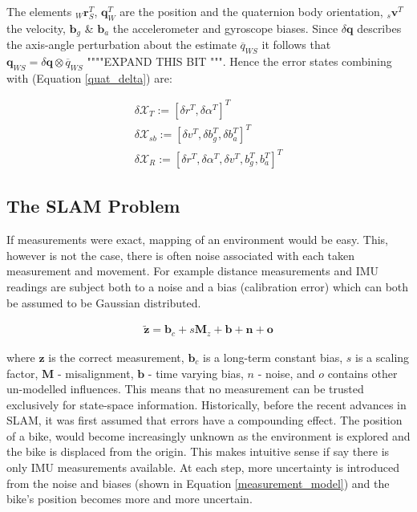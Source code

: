 \documentclass[a4paper,11pt,notitlepage]{article}
\begin{document}
The elements $_{W}\textbf{r}_{S}^{T}$, $\textbf{{q}}_{W}^{T}$ are the position and the quaternion body orientation, $_{s}\textbf{{v}}^{T}$ the velocity, $\textbf{{b}}_{g}$ \& $\textbf{{b}}_{a}$ the accelerometer and gyroscope biases. Since $\delta \textbf{q}$ describes the axis-angle perturbation about the estimate $\overline{q}_{WS}$ it follows that $\textbf{q}_{WS} = \delta \textbf{q} \otimes \overline{q}_{WS}$ """"EXPAND THIS BIT """. Hence the error states combining with (Equation \ref{quat_delta}) are:

\begin{equation}
\begin{aligned}
\label{states_2}
\delta \mathcal{X}_{T} := [ \delta r^{T}, \delta \alpha^{T} ]^{T} \\
\delta \mathcal{X}_{sb} := [ \delta v^{T}, \delta b_{g}^{T},\delta b_{a}^{T} ]^{T} \\
\delta \mathcal{X}_{R} := [ \delta r^{T}, \delta \alpha^{T}, \delta v^{T},b_{g}^{T}, b_{a}^{T}]^{T}
\end{aligned}
\end{equation}


\subsection{The SLAM Problem}

If measurements were exact, mapping of an environment would be easy. This, however is not the case, there is often noise associated with each taken measurement and movement. For example distance measurements and IMU readings are subject both to a noise and a bias (calibration error) which can both be assumed to be Gaussian distributed.

\begin{equation}
\begin{aligned}
\mathbf{\tilde{z}} = \textbf{b}_{c} + s\textbf{M}_{z} + \textbf{b} + \textbf{n} + \textbf{o}
\end{aligned}
\label{measurement_model}
\end{equation}

where $\textbf{z}$ is the correct measurement, $\textbf{b}_{c}$ is a long-term constant bias, $s$ is a scaling factor, $\textbf{M}$ - misalignment, $\textbf{b}$ - time varying bias, $n$ - noise, and $o$ contains other un-modelled influences. This means that no measurement can be trusted exclusively for state-space information. \newline\newline
Historically, before the recent advances in SLAM, it was first assumed that errors have a compounding effect. The position of a bike, would become increasingly unknown as the environment is explored and the bike is displaced from the origin. This makes intuitive sense if say there is only IMU measurements available. At each step, more uncertainty is introduced from the noise and biases (shown in Equation \ref{measurement_model}) and the bike's position becomes more and more uncertain.
\end{document}
